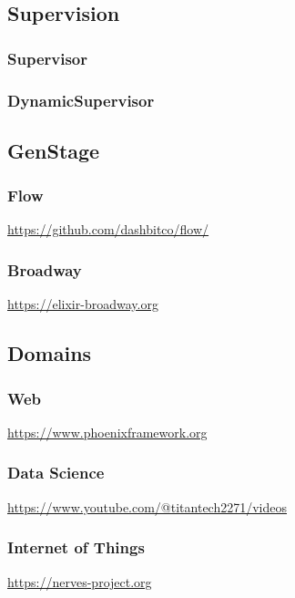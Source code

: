 \subsection{Supervision}
\subsubsection{Supervisor}
\subsubsection{DynamicSupervisor}

\subsection{GenStage}
\subsubsection{Flow}

\url{https://github.com/dashbitco/flow/}

\subsubsection{Broadway}

\url{https://elixir-broadway.org}

\subsection{Domains}

\subsubsection{Web}

\url{https://www.phoenixframework.org}



\subsubsection{Data Science}

\url{https://www.youtube.com/@titantech2271/videos}

\subsubsection{Internet of Things}

\url{https://nerves-project.org}

